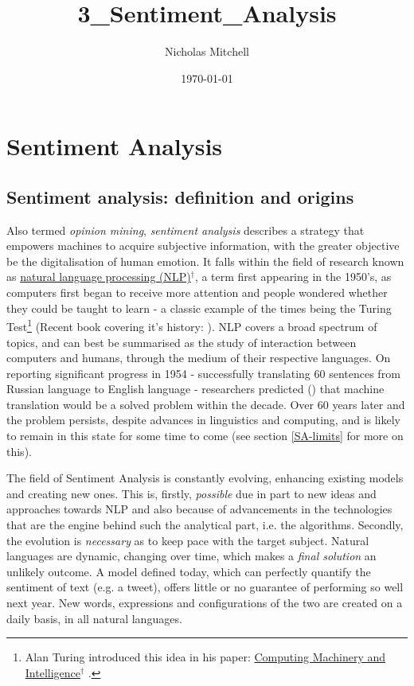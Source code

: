 \documentclass{article}
\author{Nicholas Mitchell}
\date{\today}
\title{3\_Sentiment\_Analysis}
\begin{document}
\maketitle
\tableofcontents


\section{Sentiment Analysis}
\label{sec-1}


\subsection{Sentiment analysis: definition and origins \label{sent-defn}}
\label{sec-1-1}
Also termed \emph{opinion mining}, \emph{sentiment analysis} describes a strategy that empowers machines to acquire subjective information, with the greater objective be the digitalisation of human emotion. It falls within the field of research known as \href{https://en.wikipedia.org/wiki/Natural_language_processing}{natural language processing (NLP)$^{\dag{}}$}, a term first appearing in the 1950's, as computers first began to receive more attention and people wondered whether they could be taught to learn - a classic example of the times being the Turing Test\footnote{Alan Turing introduced this idea in his paper: \href{https://en.wikipedia.org/wiki/Computing_Machinery_and_Intelligence}{Computing Machinery and Intelligence$^{\dag{}}$} \cite{turing1950computing}.} (Recent book covering it's history: \cite{Saygin2003}). NLP covers a broad spectrum of topics, and can best be summarised as the study of interaction between computers and humans, through the medium of their respective languages. On reporting significant progress in 1954 - successfully translating 60 sentences from Russian language to English language - researchers predicted (\cite{dostert1955georgetown}) that machine translation would be a solved problem within the decade. Over 60 years later and the problem persists, despite advances in linguistics and computing, and is likely to remain in this state for some time to come (see section \ref{SA-limits} for more on this).

The field of Sentiment Analysis is constantly evolving, enhancing existing models and creating new ones. This is, firstly, \emph{possible} due in part to new ideas and approaches towards NLP and also because of advancements in the technologies that are the engine behind such the analytical part, i.e. the algorithms. Secondly, the evolution is \emph{necessary} as to keep pace with the target subject. Natural languages are dynamic, changing over time, which makes a \emph{final solution} an unlikely outcome. A model defined today, which can perfectly quantify the sentiment of text (e.g. a tweet), offers little or no guarantee of performing so well next year. New words, expressions and configurations of the two are created on a daily basis, in all natural languages.
\end{document}
